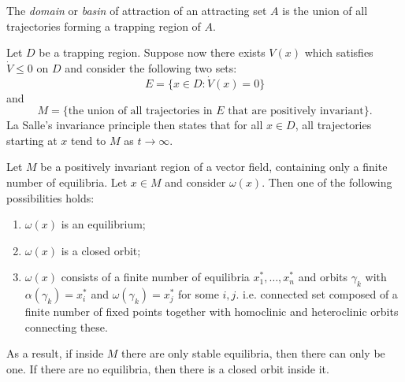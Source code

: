 \begin{definition}
    The \emph{domain} or \emph{basin} of attraction of an attracting set $A$ is the union of all trajectories forming a trapping region of $A$.
\end{definition}

\begin{theorem}
    Let $D$ be a trapping region. Suppose now there exists $V(x)$ which satisfies $\dot V \leq 0$ on $D$ and consider the following two sets:
    \begin{equation}
        E = \{x \in D : \dot V(x) = 0\}
    \end{equation}
    and
    \begin{equation}
        M = \{\text{the union of all trajectories in $E$ that are positively invariant}\}.
    \end{equation}
    La Salle's invariance principle then states that for all $x \in D$, all trajectories starting at $x$ tend to $M$ as $t \to \infty$.
\end{theorem}

\begin{theorem}
    Let $M$ be a positively invariant region of a vector field, containing only a finite number of equilibria. Let $x \in M$ and consider $\omega(x)$. Then one of the following possibilities holds:
    \begin{enumerate}
        \item $\omega(x)$ is an equilibrium;
        \item $\omega(x)$ is a closed orbit;
        \item $\omega(x)$ consists of a finite number of equilibria $x_1^\ast, \dotsc, x_n^\ast$ and orbits $\gamma_k$ with $\alpha(\gamma_k) = x_i^\ast$ and $\omega(\gamma_k) = x_j^\ast$ for some $i, j$. i.e. connected set composed of a finite number of fixed points together with homoclinic and heteroclinic orbits connecting these.
    \end{enumerate}
\end{theorem}

As a result, if inside $M$ there are only stable equilibria, then there can only be one. If there are no equilibria, then there is a closed orbit inside it.